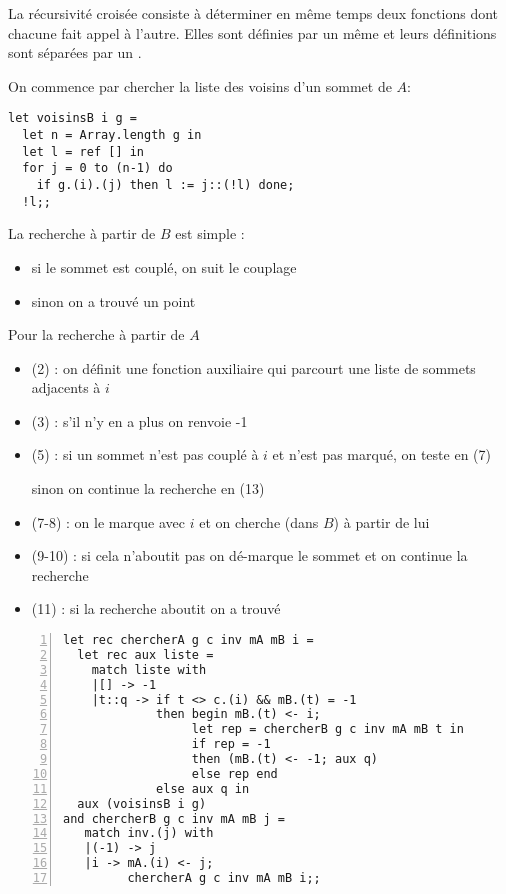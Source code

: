 \begin{Answer}
La récursivité croisée consiste à déterminer en même temps deux fonctions dont chacune fait appel à l'autre. Elles sont définies par un même  et leurs définitions sont séparées par un .

\medskip
On commence par chercher la liste des voisins d'un sommet de $A$:
\begin{lstlisting}
let voisinsB i g =
  let n = Array.length g in
  let l = ref [] in
  for j = 0 to (n-1) do
    if g.(i).(j) then l := j::(!l) done;
  !l;;
\end{lstlisting}

La recherche à partir de $B$ est simple : 

\begin{itemize}
  \item si le sommet est couplé, on suit le couplage
  \item sinon on a trouvé un point
\end{itemize}

Pour la recherche à partir de $A$ 

\begin{itemize}
  \item (2) : on définit une fonction auxiliaire qui parcourt une liste de sommets adjacents à $i$
  \item (3) : s'il n'y en a plus on renvoie -1
  \item (5) : si un sommet n'est pas couplé à $i$ et n'est pas marqué, on teste en (7)
  
        sinon on continue la recherche en (13)
  \item (7-8) : on le marque avec $i$ et on cherche (dans $B$) à partir de lui
  \item (9-10) : si cela n'aboutit pas on dé-marque le sommet et on continue la recherche
  \item (11) : si la recherche aboutit on a trouvé
\end{itemize}

\begin{lstlisting}[numbers=left]
let rec chercherA g c inv mA mB i =
  let rec aux liste =
    match liste with
    |[] -> -1
    |t::q -> if t <> c.(i) && mB.(t) = -1
             then begin mB.(t) <- i;
                  let rep = chercherB g c inv mA mB t in
                  if rep = -1
                  then (mB.(t) <- -1; aux q)
                  else rep end 
             else aux q in
  aux (voisinsB i g)
and chercherB g c inv mA mB j =
   match inv.(j) with
   |(-1) -> j
   |i -> mA.(i) <- j;
         chercherA g c inv mA mB i;;
\end{lstlisting}
\end{Answer}
